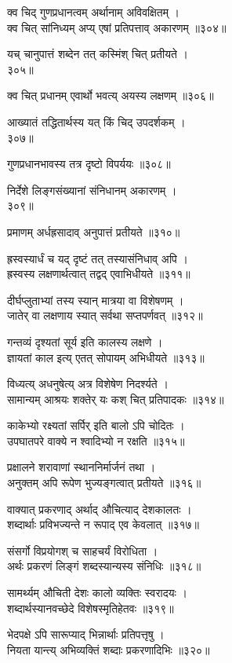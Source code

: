क्व चिद् गुणप्रधानत्वम् अर्थानाम् अविवक्षितम् ।\\क्व चित् सांनिध्यम् अप्य् एषां प्रतिपत्ताव् अकारणम् ॥३०४॥

यच् चानुपात्तं शब्देन तत् कस्मिंश् चित् प्रतीयते ।\\३०५॥

क्व चित् प्रधानम् एवार्थो भवत्य् अयस्य लक्षणम् ॥३०६॥

आख्यातं तद्धितार्थस्य यत् किं चिद् उपदर्शकम् ।\\३०७॥

गुणप्रधानभावस्य तत्र दृष्टो विपर्ययः ॥३०८॥

निर्देशे लिङ्गसंख्यानां संनिधानम् अकारणम् ।\\३०९॥

प्रमाणम् अर्धह्रसादाव् अनुपात्तं प्रतीयते ॥३१०॥

ह्रस्वस्यार्धं च यद् दृष्टं तत् तस्यासंनिधाव् अपि ।\\ह्रस्वस्य लक्षणार्थत्वात् तद्वद् एवाभिधीयते ॥३११॥

दीर्घप्लुताभ्यां तस्य स्यान् मात्रया वा विशेषणम् ।\\जातेर् वा लक्षणाय स्यात् सर्वथा सप्तपर्णवत् ॥३१२॥

गन्तव्यं दृश्यतां सूर्य इति कालस्य लक्षणे ।\\ज्ञायतां काल इत्य् एतत् सोपायम् अभिधीयते ॥३१३॥

विध्यत्य् अधनुषेत्य् अत्र विशेषेण निदर्श्यते ।\\सामान्यम् आश्रयः शक्तेर् यः कश् चित् प्रतिपादकः ॥३१४॥

काकेभ्यो रक्ष्यतां सर्पिर् इति बालो ऽपि चोदितः ।\\उपघातपरे वाक्ये न श्वादिभ्यो न रक्षति ॥३१५॥

प्रक्षालने शरावाणां स्थाननिर्मार्जनं तथा ।\\अनुक्तम् अपि रूपेण भुज्यङ्गत्वात् प्रतीयते ॥३१६॥

वाक्यात् प्रकरणाद् अर्थाद् औचित्याद् देशकालतः ।\\शब्दार्थाः प्रविभज्यन्ते न रूपाद् एव केवलात् ॥३१७॥

संसर्गो विप्रयोगश् च साहचर्यं विरोधिता ।\\अर्थः प्रकरणं लिङ्गं शब्दस्यान्यस्य संनिधिः ॥३१८॥

सामर्थ्यम् औचिती देशः कालो व्यक्तिः स्वरादयः ।\\शब्दार्थस्यानवच्छेदे विशेषस्मृतिहेतवः ॥३१९॥

भेदपक्षे ऽपि सारूप्याद् भिन्नार्थाः प्रतिपत्तृषु ।\\नियता यान्त्य् अभिव्यक्तिं शब्दाः प्रकरणादिभिः ॥३२०॥

